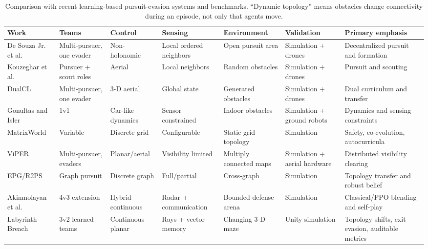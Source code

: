 \documentclass[journal]{IEEEtran}
\begin{document}
\begin{table}[t]
\centering
\caption{Comparison with recent learning-based pursuit-evasion systems and benchmarks. ``Dynamic topology'' means obstacles change connectivity during an episode, not only that agents move.}
\label{tab:related_comparison}
\footnotesize
\setlength{\tabcolsep}{4pt}
\begin{tabular}{p{2.5cm}p{1.35cm}p{1.7cm}p{1.7cm}p{1.65cm}p{1.65cm}p{2.1cm}}
\toprule
Work & Teams & Control & Sensing & Environment & Validation & Primary emphasis \\
\midrule
De Souza Jr. et al. \cite{desouza2020} & Multi-pursuer, one evader & Non-holonomic & Local ordered neighbors & Open pursuit area & Simulation + drones & Decentralized pursuit and formation \\
Kouzeghar et al. \cite{kouzeghar2023} & Pursuer + scout roles & Aerial & Local neighbors & Random obstacles & Simulation + drones & Pursuit and scouting \\
DualCL \cite{chen2023dualcl} & Multi-pursuer, one evader & 3-D aerial & Global state & Generated obstacles & Simulation + drones & Dual curriculum and transfer \\
Gonultas and Isler \cite{gonultas2024} & 1v1 & Car-like dynamics & Sensor constrained & Indoor obstacles & Simulation + ground robots & Dynamics and sensing constraints \\
MatrixWorld \cite{matrixworld2023} & Variable & Discrete grid & Configurable & Static grid topology & Simulation & Safety, co-evolution, autocurricula \\
ViPER \cite{viper2025} & Multi-pursuer, evaders & Planar/aerial & Visibility limited & Multiply connected maps & Simulation + aerial hardware & Distributed visibility clearing \\
EPG/R2PS \cite{lu2025epg,lu2026r2ps} & Graph pursuit & Discrete graph & Full/partial & Cross-graph & Simulation & Topology transfer and robust belief \\
Akinmolayan et al. \cite{akinmolayan2026} & 4v3 extension & Hybrid continuous & Radar + communication & Bounded defense arena & Simulation & Classical/PPO blending and self-play \\
Labyrinth Breach & 3v2 learned teams & Continuous planar & Rays + vector memory & Changing 3-D maze & Unity simulation & Topology shifts, exit evasion, auditable metrics \\
\bottomrule
\end{tabular}
\end{table}
\end{document}
